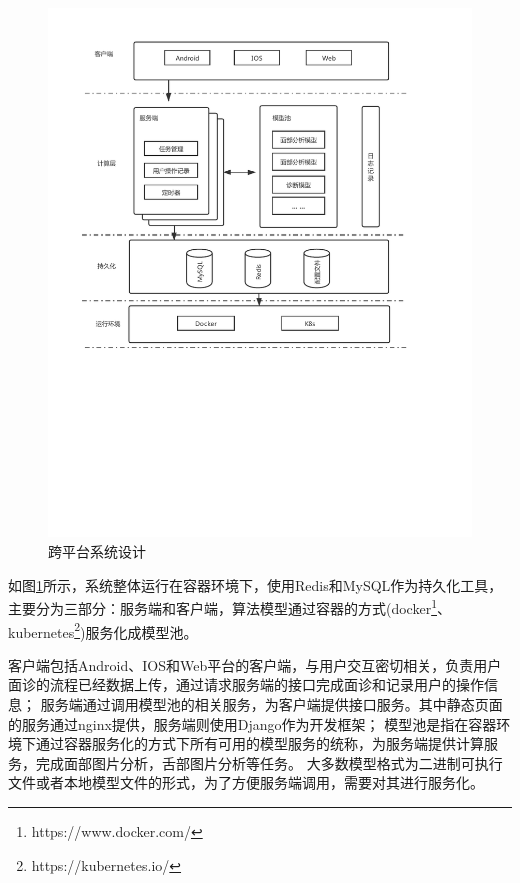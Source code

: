\begin{figure}[ht]
    \centering
    \includegraphics[width=15cm]{images/system2.pdf}
    \caption{跨平台系统设计}
    \label{fig:system}
\end{figure}

如图\ref{fig:system}所示，系统整体运行在容器环境下，使用Redis和MySQL作为持久化工具，主要分为三部分：服务端和客户端，算法模型通过容器的方式(docker\footnote{https://www.docker.com/}、kubernetes\footnote{https://kubernetes.io/})服务化成模型池。

客户端包括Android、IOS和Web平台的客户端，与用户交互密切相关，负责用户面诊的流程已经数据上传，通过请求服务端的接口完成面诊和记录用户的操作信息；
服务端通过调用模型池的相关服务，为客户端提供接口服务。其中静态页面的服务通过nginx提供，服务端则使用Django作为开发框架；
模型池是指在容器环境下通过容器服务化的方式下所有可用的模型服务的统称，为服务端提供计算服务，完成面部图片分析，舌部图片分析等任务。
大多数模型格式为二进制可执行文件或者本地模型文件的形式，为了方便服务端调用，需要对其进行服务化。

